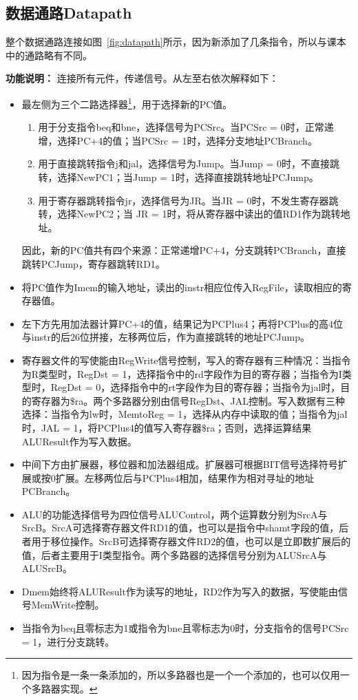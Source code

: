 \documentclass[twocolumn]{article} %
\begin{document}
\begin{sloppypar}
\subsection{数据通路Datapath}

整个数据通路连接如图~\ref{fig:datapath}所示，因为新添加了几条指令，所以与课本中的通路略有不同。

{\bf 功能说明：} 连接所有元件，传递信号。从左至右依次解释如下：
\begin{itemize}
\item 最左侧为三个二路选择器\footnote{因为指令是一条一条添加的，所以多路器也是一个一个添加的，也可以仅用一个多路器实现。}，用于选择新的PC值。
\begin{enumerate}
\item 用于分支指令beq和bne，选择信号为PCSrc。当PCSrc = 0时，正常递增，选择PC+4的值；当PCSrc = 1时，选择分支地址PCBranch。
\item 用于直接跳转指令j和jal，选择信号为Jump。当Jump = 0时，不直接跳转，选择NewPC1；当Jump = 1时，选择直接跳转地址PCJump。
\item 用于寄存器跳转指令jr，选择信号为JR。当JR = 0时，不发生寄存器跳转，选择NewPC2；当 JR = 1时，将从寄存器中读出的值RD1作为跳转地址。
\end{enumerate}
因此，新的PC值共有四个来源：正常递增PC+4，分支跳转PCBranch，直接跳转PCJump，寄存器跳转RD1。
\item 将PC值作为Imem的输入地址，读出的instr相应位传入RegFile，读取相应的寄存器值。
\item 左下方先用加法器计算PC+4的值，结果记为PCPlus4；再将PCPlus的高4位与instr的后26位拼接，左移两位后，作为直接跳转的地址PCJump。
\item 寄存器文件的写使能由RegWrite信号控制，写入的寄存器有三种情况：当指令为R类型时，RegDst = 1，选择指令中的rd字段作为目的寄存器；当指令为I类型时，RegDst = 0，选择指令中的rt字段作为目的寄存器；当指令为jal时，目的寄存器为\$ra。两个多路器分别由信号RegDst、JAL控制。写入数据有三种选择：当指令为lw时，MemtoReg = 1，选择从内存中读取的值；当指令为jal时，JAL = 1，将PCPlus4的值写入寄存器\$ra；否则，选择运算结果ALUResult作为写入数据。
\item 中间下方由扩展器，移位器和加法器组成。扩展器可根据BIT信号选择符号扩展或按0扩展。左移两位后与PCPlus4相加，结果作为相对寻址的地址PCBranch。
\item ALU的功能选择信号为四位信号ALUControl，两个运算数分别为SrcA与SrcB。SrcA可选择寄存器文件RD1的值，也可以是指令中shamt字段的值，后者用于移位操作。SrcB可选择寄存器文件RD2的值，也可以是立即数扩展后的值，后者主要用于I类型指令。两个多路器的选择信号分别为ALUSrcA与ALUSrcB。
\item Dmem始终将ALUResult作为读写的地址，RD2作为写入的数据，写使能由信号MemWrite控制。
\item 当指令为beq且零标志为1或指令为bne且零标志为0时，分支指令的信号PCSrc = 1，进行分支跳转。
\end{itemize}


\end{sloppypar}
\end{document}
